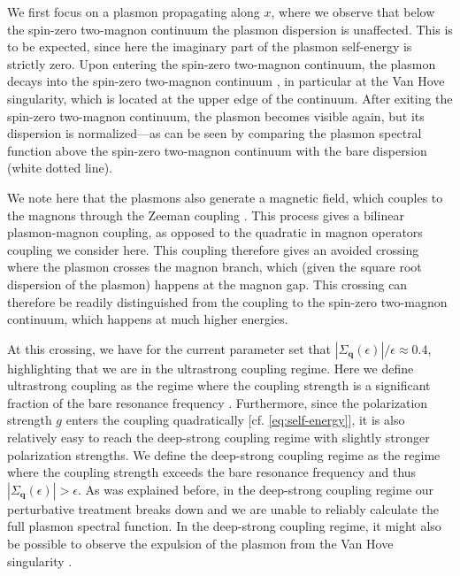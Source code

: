 \documentclass[aps,prb,reprint,twocolumns,superscriptaddress,nofootinbib]{revtex4-2}
\begin{document}
	
	
	We first focus on a plasmon propagating along ${x}$, where we observe that below the spin-zero two-magnon continuum the plasmon dispersion is unaffected. This is to be expected, since here the imaginary part of the plasmon self-energy is strictly zero. Upon entering the spin-zero two-magnon continuum, the plasmon decays into the spin-zero two-magnon continuum \cite{verresenAvoidedQuasiparticleDecay2019}, in particular at the Van Hove singularity, which is located at the upper edge of the continuum.
	After exiting the spin-zero two-magnon continuum, the plasmon becomes visible again, but its dispersion is normalized---as can be seen by comparing the plasmon spectral function above the spin-zero two-magnon continuum with the bare dispersion (white dotted line). 

	We note here that the plasmons also generate a magnetic field, which couples to the magnons through the Zeeman coupling \cite{costaStronglyCoupledMagnonplasmon2023,yuanStrongTunableCoupling2024,yuanBreakingSurfacePlasmonExcitation2024}. This process gives a bilinear plasmon-magnon coupling, as opposed to the quadratic in magnon operators coupling we consider here. This coupling therefore gives an avoided crossing where the plasmon crosses the magnon branch, which (given the square root dispersion of the plasmon) happens at the magnon gap. This crossing can therefore be readily distinguished from the coupling to the spin-zero two-magnon continuum, which happens at much higher energies.

	At this crossing, we have for the current parameter set that $|\Sigma_{\bm q}(\epsilon)|/\epsilon\approx0.4$, highlighting that we are in the ultrastrong coupling regime. Here we define ultrastrong coupling as the regime where the coupling strength is a significant fraction of the bare resonance frequency \cite{friskkockumUltrastrongCouplingLight2019}.
	Furthermore, since the polarization strength $g$ enters the coupling quadratically [cf. \cref{eq:self-energy}], it is also relatively easy to reach the deep-strong coupling regime with  slightly stronger polarization strengths. We define the deep-strong coupling regime as the regime where the coupling strength exceeds the bare resonance frequency and thus $|\Sigma_{\bm q}(\epsilon)|>\epsilon$.
	 As was explained before, in the deep-strong coupling regime our perturbative treatment breaks down and we are unable to reliably calculate the full plasmon spectral function. In the deep-strong coupling  regime, it might also be possible to observe the expulsion of the plasmon from the Van Hove singularity \cite{verresenAvoidedQuasiparticleDecay2019}.
	
\end{document}
